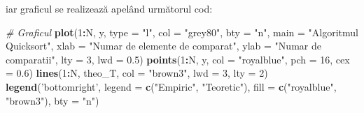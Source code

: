 \documentclass[]{article}
\newenvironment{Shaded}{\begin{snugshade}}{\end{snugshade}}
\newcommand{\KeywordTok}[1]{\textcolor[rgb]{0.13,0.29,0.53}{\textbf{#1}}}
\newcommand{\DataTypeTok}[1]{\textcolor[rgb]{0.13,0.29,0.53}{#1}}
\newcommand{\DecValTok}[1]{\textcolor[rgb]{0.00,0.00,0.81}{#1}}
\newcommand{\FloatTok}[1]{\textcolor[rgb]{0.00,0.00,0.81}{#1}}
\newcommand{\StringTok}[1]{\textcolor[rgb]{0.31,0.60,0.02}{#1}}
\newcommand{\CommentTok}[1]{\textcolor[rgb]{0.56,0.35,0.01}{\textit{#1}}}
\newcommand{\OperatorTok}[1]{\textcolor[rgb]{0.81,0.36,0.00}{\textbf{#1}}}
\newcommand{\NormalTok}[1]{#1}
\begin{document}
iar graficul se realizează apelând următorul cod:

\begin{Shaded}
\begin{Highlighting}[]
\CommentTok{# Graficul}
\KeywordTok{plot}\NormalTok{(}\DecValTok{1}\OperatorTok{:}\NormalTok{N, y, }\DataTypeTok{type =} \StringTok{"l"}\NormalTok{, }
     \DataTypeTok{col =} \StringTok{"grey80"}\NormalTok{,}
     \DataTypeTok{bty =} \StringTok{"n"}\NormalTok{, }
     \DataTypeTok{main =} \StringTok{"Algoritmul Quicksort"}\NormalTok{,}
     \DataTypeTok{xlab =} \StringTok{"Numar de elemente de comparat"}\NormalTok{,}
     \DataTypeTok{ylab =} \StringTok{"Numar de comparatii"}\NormalTok{,}
     \DataTypeTok{lty =} \DecValTok{3}\NormalTok{,}
     \DataTypeTok{lwd =} \FloatTok{0.5}\NormalTok{)}
\KeywordTok{points}\NormalTok{(}\DecValTok{1}\OperatorTok{:}\NormalTok{N, y, }
       \DataTypeTok{col =} \StringTok{"royalblue"}\NormalTok{, }
       \DataTypeTok{pch =} \DecValTok{16}\NormalTok{,}
       \DataTypeTok{cex =} \FloatTok{0.6}\NormalTok{)}
\KeywordTok{lines}\NormalTok{(}\DecValTok{1}\OperatorTok{:}\NormalTok{N, theo_T, }\DataTypeTok{col =} \StringTok{"brown3"}\NormalTok{, }\DataTypeTok{lwd =} \DecValTok{3}\NormalTok{, }\DataTypeTok{lty =} \DecValTok{2}\NormalTok{)}
\KeywordTok{legend}\NormalTok{(}\StringTok{'bottomright'}\NormalTok{, }
       \DataTypeTok{legend =} \KeywordTok{c}\NormalTok{(}\StringTok{"Empiric"}\NormalTok{, }\StringTok{"Teoretic"}\NormalTok{), }
       \DataTypeTok{fill =} \KeywordTok{c}\NormalTok{(}\StringTok{"royalblue"}\NormalTok{, }\StringTok{"brown3"}\NormalTok{),}
       \DataTypeTok{bty =} \StringTok{"n"}\NormalTok{)}
\end{Highlighting}
\end{Shaded}
\end{document}
